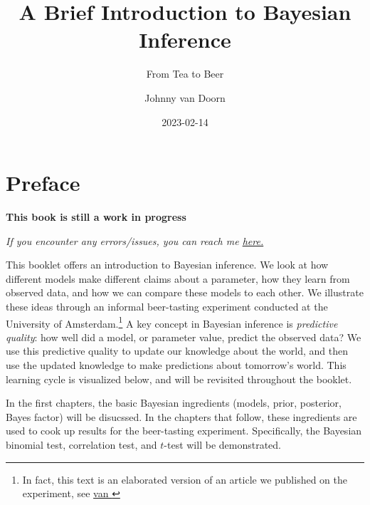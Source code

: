 \documentclass[
]{book}
\title{A Brief Introduction to Bayesian Inference}
\subtitle{From Tea to Beer}
\author{Johnny van Doorn}
\date{2023-02-14}
\begin{document}
\maketitle

{
\hypersetup{linkcolor=}
\setcounter{tocdepth}{1}
\tableofcontents
}
\hypertarget{preface}{%
\chapter*{Preface}\label{preface}}

\textbf{This book is still a work in progress}

\emph{If you encounter any errors/issues, you can reach me \href{mailto:j.b.vandoorn@uva.nl}{here.}}

This booklet offers an introduction to Bayesian inference. We look at how different models make different claims about a parameter, how they learn from observed data, and how we can compare these models to each other. We illustrate these ideas through an informal beer-tasting experiment conducted at the University of Amsterdam.\footnote{In fact, this text is an elaborated version of an article we published on the experiment, see \href{https://journals.sagepub.com/doi/full/10.1177/1475725719848574}{van \citet{vanDoorn2020class}}}
A key concept in Bayesian inference is \emph{predictive quality}: how well did a model, or parameter value, predict the observed data? We use this predictive quality to update our knowledge about the world, and then use the updated knowledge to make predictions about tomorrow's world. This learning cycle is visualized below, and will be revisited throughout the booklet.

In the first chapters, the basic Bayesian ingredients (models, prior, posterior, Bayes factor) will be disucssed. In the chapters that follow, these ingredients are used to cook up results for the beer-tasting experiment. Specifically, the Bayesian binomial test, correlation test, and \(t\)-test will be demonstrated.
\end{document}
